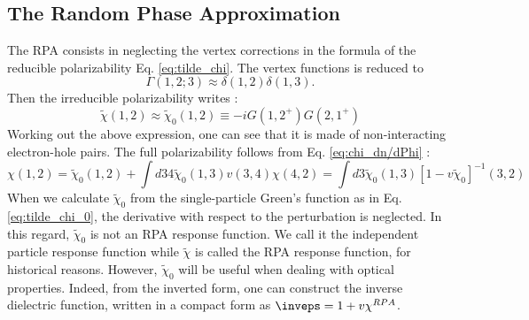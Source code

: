 \subsection{The Random Phase Approximation} 
The \acrfull{RPA} consists in neglecting the vertex corrections in the formula of the reducible polarizability Eq. \eqref{eq:tilde_chi}. The vertex functions is reduced to 
\begin{equation}
	\Gamma(1,2;3) \approx \delta(1,2)\delta(1,3).
\end{equation}
Then the irreducible polarizability writes :
\begin{equation}
	\tilde{\chi}(1,2) \approx \tilde{\chi}_0(1,2) \equiv -i G(1,2^+)G(2,1^+) \label{eq:tilde_chi_0}
\end{equation}
Working out the above expression, one can see that it is made of non-interacting electron-hole pairs. The full polarizability follows from Eq. \eqref{eq:chi_dn/dPhi} :
\begin{equation}
	\chi(1,2) = \tilde{\chi}_0(1,2) + \int d34 \tilde{\chi}_0(1,3) v(3,4) \chi(4,2) = \int d3 \tilde{\chi}_0(1,3) \left[ 1 - v \tilde{\chi}_0\right]^{-1}(3,2)
\end{equation}
When we calculate $\tilde{\chi}_0$ from the single-particle Green's function as in Eq. \eqref{eq:tilde_chi_0}, the derivative with respect to the perturbation is neglected. In this regard, $\tilde{\chi}_0$ is not an \acrshort{RPA} response function. We call it the independent particle response function while $\tilde{\chi}$ is called the RPA response function, for historical reasons.
However, $\tilde{\chi}_0$ will be useful when dealing with optical properties. Indeed, from the inverted form, one can construct the inverse dielectric function, written in a compact form as $\inveps = 1+v \chi^{RPA}$.

%
